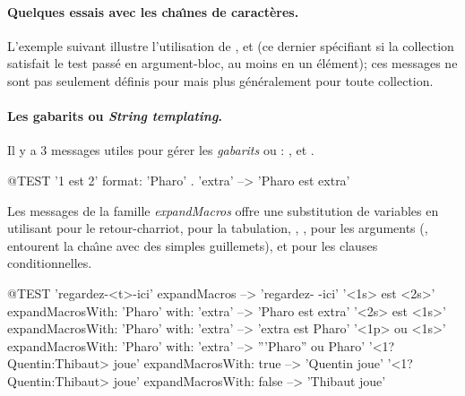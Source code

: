 \documentclass[a4paper,10pt,twoside]{book}
\begin{document}
\paragraph{Quelques essais avec les cha\^{\i}nes de caract\`eres.} 
L'exemple suivant illustre l'utilisation de ,  et  
(ce dernier sp\'ecifiant si la collection satisfait le test pass\'e en argument-bloc, au moins en un \'el\'ement);
ces messages ne sont pas seulement d\'efinis pour  mais plus g\'en\'eralement pour toute collection.


\paragraph{Les gabarits ou \emph{String templating}.}
Il y a 3 messages utiles pour g\'erer les \emph{gabarits} ou : ,  et .

\begin{code}{@TEST}
'{1} est {2}' format: {'Pharo' . 'extra'}  --> 'Pharo est extra'
\end{code} %

Les messages de la famille \emph{expandMacros} offre une substitution
de variables en utilisant  pour le retour-charriot,  
pour la tabulation, , ,  pour les arguments
(,  entourent la cha\^{\i}ne avec des simples guillemets),
et  pour les clauses conditionnelles.


\begin{code}{@TEST}
'regardez-<t>-ici' expandMacros                                         --> 'regardez-	-ici'
'<1s> est <2s>' expandMacrosWith: 'Pharo' with: 'extra'   --> 'Pharo est extra'
'<2s> est <1s>' expandMacrosWith: 'Pharo' with: 'extra'   --> 'extra est Pharo'
'<1p> ou <1s>' expandMacrosWith: 'Pharo' with: 'extra'  --> '''Pharo'' ou Pharo'
'<1?Quentin:Thibaut> joue' expandMacrosWith: true     --> 'Quentin joue'
'<1?Quentin:Thibaut> joue' expandMacrosWith: false    --> 'Thibaut joue'
\end{code}
\end{document}
